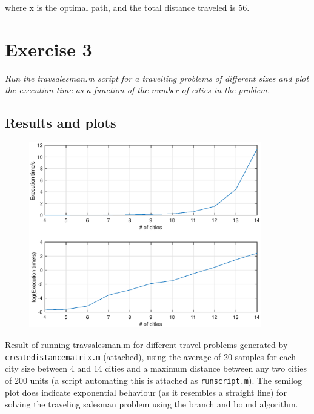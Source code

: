 \documentclass{article}
\begin{document}
  \noindent
  where x is the optimal path, and the total distance traveled is 56.

  \newpage

\section*{Exercise 3}

  \textit{Run the travsalesman.m script for a travelling problems of different
  sizes and plot the execution time as a function of the number of cities in
  the problem.}

  \subsection*{Results and plots}

  \begin{figure}[!h]
    \centering
    \includegraphics[width=0.9\textwidth]{4_14_20samples.eps}
  \end{figure}

  \noindent
  Result of running travsalesman.m for different travel-problems generated by
  \texttt{createdistancematrix.m} (attached), using the average of 20 samples for each city
  size between 4 and 14 cities and a maximum distance between any two cities of 200 units
  (a script automating this is attached as \texttt{runscript.m}). The semilog plot does indicate exponential behaviour (as it
  resembles a straight line)
  for solving the traveling salesman problem using the branch and bound algorithm.
\end{document}
